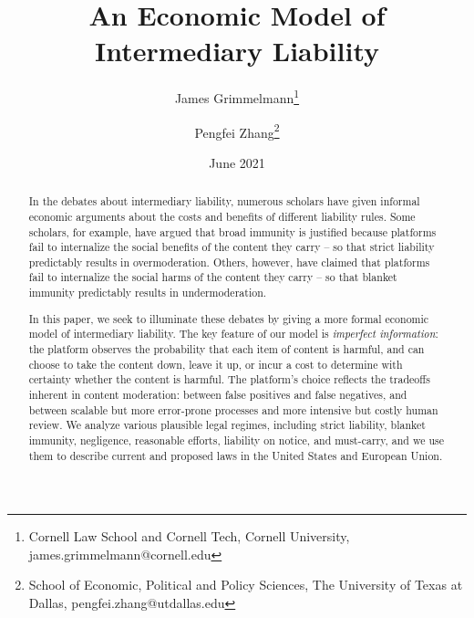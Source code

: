 \documentclass[openbib,12pt]{article}  %
\title{An Economic Model of Intermediary Liability}
\author{James Grimmelmann\footnote{Cornell Law School and Cornell Tech, Cornell University, james.grimmelmann@cornell.edu}
\and Pengfei Zhang\footnote{School of Economic, Political and Policy Sciences, The University of Texas at Dallas, pengfei.zhang@utdallas.edu}}
\date{June 2021}
\begin{document}
\maketitle
\begin{abstract}
\noindent 
In the debates about intermediary liability, numerous scholars have given informal economic arguments about the costs and benefits of different liability rules. Some scholars, for example, have argued that broad immunity is justified because platforms fail to internalize the social benefits of the content they carry -- so that strict liability predictably results in overmoderation. Others, however, have claimed that platforms fail to internalize the social harms of the content they carry -- so that blanket immunity predictably results in undermoderation.

In this paper, we seek to illuminate these debates by giving a more formal economic model of intermediary liability. The key feature of our model is \emph{imperfect information}: the platform observes the probability that each item of content is harmful, and can choose to take the content down, leave it up, or incur a cost to determine with certainty whether the content is harmful. The platform's choice reflects the tradeoffs inherent in content moderation: between false positives and false negatives, and between scalable but more error-prone processes and more intensive but costly human review. We analyze various plausible legal regimes, including strict liability, blanket immunity, negligence, reasonable efforts, liability on notice, and must-carry, and we use them to describe current and proposed laws in the United States and European Union.


\vspace{0in}
\end{abstract}
\end{document}
